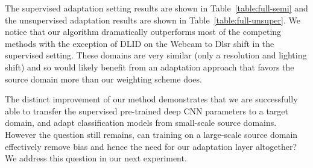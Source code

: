 The supervised adaptation setting results are shown in Table~\ref{table:full-semi} and the unsupervised adaptation results are shown in Table~\ref{table:full-unsuper}. We notice that our algorithm dramatically outperforms most of the competing methods with the exception of DLID on the Webcam to Dlsr shift in the supervised setting. These domains are very similar (only a resolution and lighting shift) and so would likely benefit from an adaptation approach that favors the source domain more than our weighting scheme does. 





The distinct improvement of our method demonstrates that we are successfully able to transfer the supervised pre-trained deep CNN parameters to a target domain, and adapt classification models from small-scale source domains. However the question still remains, 
can training on a large-scale source domain effectively remove bias and hence the need for our adaptation layer altogether? We address this question in our next experiment.


%
%




